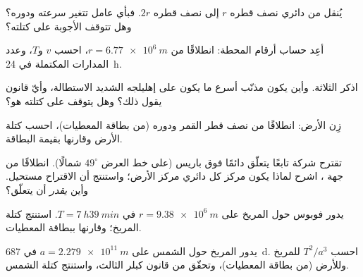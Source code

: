 \begin{exercise}[$\star$]\label{exo:g12:satellites-kepler:3}
يُنقل  من  دائري نصف قطره $r$ إلى  نصف قطره
$2r$. فبأي عامل تتغير سرعته ودوره؟ وهل تتوقف
الأجوبة على كتلته؟
\end{exercise}

\begin{exercise}[$\star$]\label{exo:g12:satellites-kepler:4}
أعِد حساب أرقام المحطة: انطلاقًا من $r = \qty{6.77e6}{m}$، احسب
$v$ و$T$، وعدد المدارات المكتملة في \qty{24}{h}.
\end{exercise}

\begin{exercise}[$\star$]\label{exo:g12:satellites-kepler:5}
اذكر  الثلاثة. وأين يكون مذنّب أسرع ما يكون على إهليلجه
الشديد الاستطالة، وأيّ قانون يقول ذلك؟ وهل يتوقف 
 على كتلته هو؟
\end{exercise}

\begin{exercise}[$\star\star$]\label{exo:g12:satellites-kepler:6}
زِن الأرض: انطلاقًا من نصف قطر  القمر ودوره (من بطاقة
المعطيات)، احسب كتلة الأرض وقارنها بقيمة البطاقة.
\end{exercise}

\begin{exercise}[$\star\star$]\label{exo:g12:satellites-kepler:7}
تقترح شركة تابعًا يتعلّق دائمًا فوق باريس
(على خط العرض $49^\circ$ شمالًا). انطلاقًا من جهة ، اشرح
لماذا يكون مركز كل  دائري مركز الأرض؛ واستنتج
أن الاقتراح مستحيل. وأين \emph{يقدر}  أن يتعلّق؟
\end{exercise}

\begin{exercise}[$\star\star$]\label{exo:g12:satellites-kepler:8}
يدور فوبوس حول المريخ على $r = \qty{9.38e6}{m}$ في $T = \qty{7}{h}
\qty{39}{min}$. استنتج كتلة المريخ؛ وقارنها ببطاقة المعطيات.
\end{exercise}

\begin{exercise}[$\star\star$]\label{exo:g12:satellites-kepler:9}
يدور المريخ حول الشمس على $a = \qty{2.279e11}{m}$ في \qty{687}{d}.
احسب $T^2/a^3$ للمريخ وللأرض (من بطاقة المعطيات)، وتحقّق من
قانون كبلر الثالث، واستنتج كتلة الشمس.
\end{exercise}

